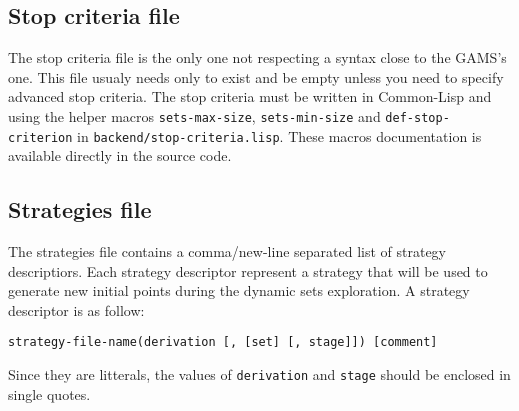 \subsection*{Stop criteria file}

The stop criteria file is the only one not respecting a syntax close to the
GAMS's one. This file usualy needs only to exist and be empty unless you need to
specify advanced stop criteria. The stop criteria must be written in Common-Lisp
and using the helper macros \texttt{sets-max-size}, \texttt{sets-min-size} and
\texttt{def-stop-criterion} in \texttt{backend/stop-criteria.lisp}. These macros
documentation is available directly in the source code.

\subsection*{Strategies file}

The strategies file contains a comma/new-line separated list of strategy
descriptiors. Each strategy descriptor represent a strategy that will be used
to generate new initial points during the dynamic sets exploration.
A strategy descriptor is as follow:
\begin{center}
  \texttt{strategy-file-name(derivation [, [set] [, stage]]) [comment]}
\end{center}
Since they are litterals, the values of \texttt{derivation} and \texttt{stage}
should be enclosed in single quotes.

